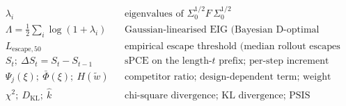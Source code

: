 \begin{align*}
                &\lambda_i && \text{eigenvalues of } \Sigma_0^{1/2} F\,\Sigma_0^{1/2} \\
                &\Lambda = \tfrac12\textstyle\sum_i\log(1+\lambda_i) && \text{Gaussian-linearised EIG (Bayesian D-optimal value)} \\
                &L_{\mathrm{escape},50} && \text{empirical escape threshold (median rollout escapes saturation)} \\
                &S_t;\ \Delta S_t = S_t - S_{t-1} && \text{sPCE on the length-} t \text{ prefix; per-step increment} \\
                &\Psi_j(\xi);\ \bar\Phi(\xi);\ H(\tilde w) && \text{competitor ratio; design-dependent term; weight entropy} \\
                &\chi^2;\ D_{\mathrm{KL}};\ \hat k && \text{chi-square divergence; KL divergence; PSIS Pareto shape}
        \end{align*}


